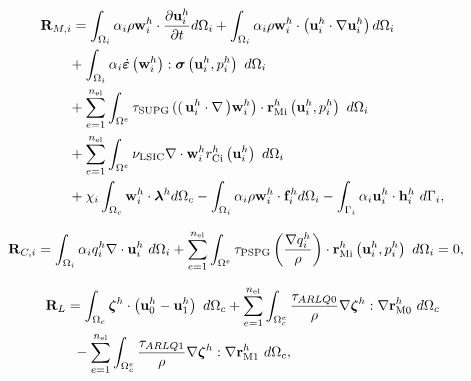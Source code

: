 \documentclass[tese_patricia]{subfiles}
\begin{document}
\begin{align}
	\begin{split}
		&\mathbf{R}_{M,i} = \int_{\domain_i} \arlequinWF_{i} \density \wArlqi \cdot \frac{\partial\uArlqi}{\partial t} d\domain_{i} +
		\int_{\domain_i} \arlequinWF_{i} \density \wArlqi \cdot  \left(\uArlqi \cdot \nabla\uArlqi\right) d\domain_{i}  \\ 
		&\qquad+	
		\int_{\domain_{i}} \arlequinWF_{i} \strainratetensor \left(\wArlqi\right) : \stresstensor \left(\uArlqi,\pArlqi\right)\ d\domain_{i} 
		\\ 
		&\qquad+ \sum_{e=1}^{\nel} \int_{\domainE} \SUPG  \left( \right(\uArlqi \cdot \nabla \left) \wArlqi\right) \cdot \resMomI \left(\uArlqi,\pArlqi \right)\  d\domain_{i} \\ 
		&\qquad+\sum_{e=1}^{\nel} \int_{\domainE} \LSIC \nabla \cdot \wArlqi \resPreI
		\left(\uArlqi\right)\  d\domain_{i} \\
		&\qquad+ \chi_{i} \int_{\domain_c} \wArlqi \cdot \lagrangeMultiplier^{h} d\domain_{c} - \int_{\domain_i} \arlequinWF_{i} \density \wArlqi \cdot  \sbodyforce_{i}^{h} d\domain_{i} - \int_{\boundary_{i}} \arlequinWF_{i} \uArlqi \cdot \straction_{i}^{h}\ d\boundary_{i},
		\label{eq:ResidualMomentum}
	\end{split}
\end{align}


\begin{align}
	\begin{split}
		&\mathbf{R}_{C,i} = \int_{\Omega_{i}} \alpha_{i} q_i^h \nabla \cdot \mathbf{u}_i^{h} \ d\Omega_{i} +
		\sum_{e=1}^{n_{\mathrm{el}}} \int_{\Omega^e} \tau_{\mathrm{PSPG}} \left(\frac{\nabla q_i^h }{\rho}\right) \cdot \mathbf{r}_{\mathrm{Mi}}^{h} \left(\mathbf{u}_i^{h},p_i^{h} \right) \  d\Omega_{i} = 0,
		\label{eq:ResidualContinum}
	\end{split}
\end{align}

\begin{align}
	\begin{split}
		&\mathbf{R}_{L} = \int_{\Omega_{c}}  \boldsymbol{\zeta}^h  \cdot \left(\mathbf{u}_0^h - \mathbf{u}_1^h \right) \ d\Omega_{c} + \sum_{e=1}^{n_{\mathrm{el}}} \int_{\Omega^e_{c}} \frac{\tau_{ARLQ0}}{\rho} \nabla \boldsymbol{\zeta}^h : \nabla \mathbf{r}_{\mathrm{M0}}^{h} \ d\Omega_{c}\\
		&\qquad - \sum_{e=1}^{n_{\mathrm{el}}} \int_{\Omega^e_{c}} \frac{\tau_{ARLQ1}}{\rho} \nabla \boldsymbol{\zeta}^h : \nabla \mathbf{r}_{\mathrm{M1}}^{h} \ d\Omega_{c},
		\label{eq:ResidualLagrange}
	\end{split}
\end{align}
\end{document}
